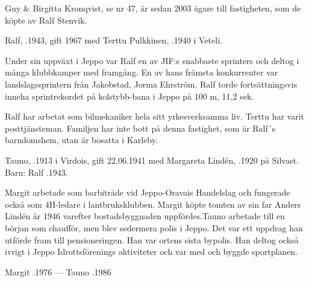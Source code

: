 
%
Guy \& Birgitta Kronqvist, se nr 47, är sedan 2003 ägare till fastigheten, som de köpte av Ralf Stenvik.


%
Ralf, .1943, gift 1967 med Terttu Pulkkinen, .1940 i Veteli.
\begin{jhchildren}
  \item {}
  \item {}
\end{jhchildren}
Under sin uppväxt i Jeppo var Ralf en av JIF:s snabbaste sprinters och deltog i många klubbkamper med framgång. En av hans främsta konkurrenter var landslagssprintern från Jakobstad, Jorma Ehrström. Ralf torde fortsättningsvis inneha sprintrekordet på kolstybb-bana i Jeppo på 100 m, 11,2 sek.

Ralf har arbetat som bilmekaniker hela sitt yrkesverksamma liv. Terttu har varit posttjänsteman. Familjen har inte bott på denna fastighet, som är Ralf´s barndomshem, utan är bosatta i Karleby.


%
Tauno, .1913 i Virdois, gift 22.06.1941 med  Margareta Lindén, .1920 på Silvast.
Barn: Ralf .1943.

Margit arbetade som barbiträde vid Jeppo-Oravais Handelslag och fungerade också som 4H-ledare i lantbruksklubben. Margit köpte tomten av sin far Anders Lindén år 1946 varefter bostadsbyggnaden uppfördes.Tauno arbetade till en början som chaufför, men blev sedermera polis i Jeppo. Det var ett uppdrag han utförde fram till pensioneringen. Han var ortens sista bypolis. Han deltog också ivrigt i Jeppo  Idrottsförenings aktiviteter och var med och byggde sportplanen.

Margit .1976  ---  Tauno .1986



%

